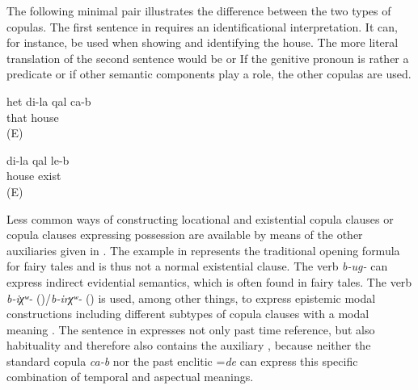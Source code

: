 The following minimal pair illustrates the difference between the two types of copulas. The first sentence in  requires an identificational interpretation. It can, for instance, be used when showing and identifying the house. The more literal translation of the second sentence  would be  or  If the genitive pronoun is rather a predicate  or if other semantic components play a role, the other copulas are used. 
%
\begin{exe}
	\ex	\label{ex:That is my house}
	\gll	het	di-la	qal	ca-b\\
		that 	house	\\
	\glt	{} (E)

	\ex	\label{ex:I have a house}
	\gll	di-la	qal	le-b\\
			house	exist\\
	\glt	{} (E)
\end{exe}


Less common ways of constructing locational and existential copula clauses or copula clauses expressing possession are available by means of the other auxiliaries given in . The example in  represents the traditional opening formula for fairy tales and is thus not a normal existential clause. The verb \textit{b-ug-} can express indirect evidential semantics, which is often found in fairy tales. The verb \textit{b-iχʷ-} ()\slash\textit{b-irχʷ-} ()  is used, among other things, to express epistemic modal constructions including different subtypes of copula clauses with a modal meaning . The sentence in  expresses not only past time reference, but also habituality and therefore also contains the auxiliary , because neither the standard copula \textit{ca-b} nor the past enclitic =\textit{de} can express this specific combination of temporal and aspectual meanings.

